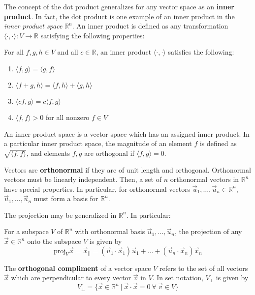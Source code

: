 The concept of the dot product generalizes for any vector space as an \textbf{inner product}. In fact, the dot product is one example of an inner product in the \textit{inner product space} $\mathbb{R}^n$. An inner product is defined as any transformation $\langle\cdot,\cdot\rangle:V\to\mathbb{R}$ satisfying the following properties:
\newpage

\begin{shaded}
    For all $f,g,h\in V$ and all $c\in\mathbb{R}$, an inner product $\langle\cdot,\cdot\rangle$ satisfies the following:
    \begin{enumerate}
        \item $\langle f,g\rangle = \langle g,f\rangle$
        \item $\langle f+g, h\rangle = \langle f, h\rangle + \langle g, h\rangle$
        \item $\langle cf, g\rangle = c \langle f,g\rangle$
        \item $\langle f,f\rangle > 0$ for all nonzero $f\in V$
    \end{enumerate}
    An inner product space is a vector space which has an assigned inner product. In a particular inner product space, the magnitude of an element $f$ is defined as $\sqrt{\langle f, f\rangle}$, and elements $f,g$ are orthogonal if $\langle f,g\rangle = 0$.
\end{shaded}

Vectors are \textbf{orthonormal} if they are of unit length and orthogonal. Orthonormal vectors must be linearly independent. Then, a set of $n$ orthonormal vectors in $\mathbb{R}^n$ have special properties. In particular, for orthonormal vectors $\vec{u}_1,\dots,\vec{u}_n\in\mathbb{R}^n$, $\vec{u}_1,\dots,\vec{u}_n$ must form a basis for $\mathbb{R}^n$.

The projection may be generalized in $\mathbb{R}^n$. In particular:

\begin{shaded}
For a subspace $V$ of $\mathbb{R}^n$ with orthonormal basis $\vec{u}_1,\dots,\vec{u}_n$, the projection of any $\vec{x}\in \mathbb{R}^n$ onto the subspace $V$ is given by \[\text{proj}_V\vec{x} = \vec{x}_{||} = (\vec{u}_1\cdot\vec{x}_1)\vec{u}_1 + \dots + (\vec{u}_n\cdot\vec{x}_n)\vec{x}_n\] 
\end{shaded}

The \textbf{orthogonal compliment} of a vector space $V$ refers to the set of all vectors $\vec{x}$ which are perpendicular to every vector $\vec{v}$ in $V$. In set notation, $V_\perp$ is given by \[V_\perp = \{\vec{x}\in\mathbb{R}^n\ |\ \vec{x}\cdot\vec{x}=0 \ \forall\ \vec{v}\in V\}\]

